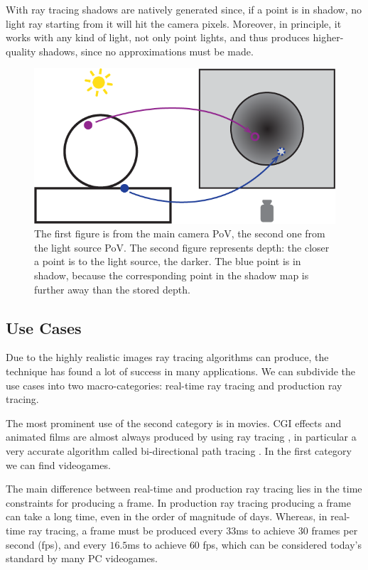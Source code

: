 \documentclass{PoliMi_MasterThesis}
\begin{document}
With ray tracing shadows are natively generated since, if a point is in shadow, no light ray starting from it will hit the camera pixels. Moreover, in principle, it works with any kind of light, not only point lights, and thus produces higher-quality shadows, since no approximations must be made.

\begin{figure}[]
    \centering
    \includegraphics[scale=0.6]{Images/shadow_map.png}
    \caption{The first figure is from the main camera PoV, the second one from the light source PoV. The second figure represents depth: the closer a point is to the light source, the darker. The blue point is in shadow, because the corresponding point in the shadow map is further away than the stored depth.}
    \label{fig:shadow_map}
\end{figure}

\subsection{Use Cases}
Due to the highly realistic images ray tracing algorithms can produce, the technique has found a lot of success in many applications. We can subdivide the use cases into two macro-categories: real-time ray tracing and production ray tracing.

The most prominent use of the second category is in movies. CGI effects and animated films are almost always produced by using ray tracing \cite{path_tracing_movies}, in particular a very accurate algorithm called bi-directional path tracing \cite{bidirectional_path_tracing}. In the first category we can find videogames.

The main difference between real-time and production ray tracing lies in the time constraints for producing a frame. In production ray tracing producing a frame can take a long time, even in the order of magnitude of days. Whereas, in real-time ray tracing, a frame must be produced every $33$ms to achieve $30$ frames per second (fps), and every $16.5$ms to achieve $60$ fps, which can be considered today's standard by many PC videogames.
\end{document}
